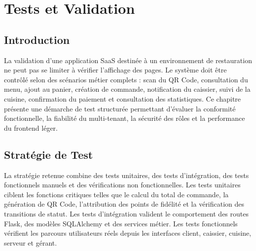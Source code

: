 \documentclass[12pt,a4paper]{report}
\begin{document}
\cleardoublepage
\chapter{Tests et Validation}

\section{Introduction}

La validation d'une application SaaS destinée à un environnement de restauration ne peut pas se limiter à vérifier l'affichage des pages. Le système doit être contrôlé selon des scénarios métier complets : scan du QR Code, consultation du menu, ajout au panier, création de commande, notification du caissier, suivi de la cuisine, confirmation du paiement et consultation des statistiques. Ce chapitre présente une démarche de test structurée permettant d'évaluer la conformité fonctionnelle, la fiabilité du multi-tenant, la sécurité des rôles et la performance du frontend léger.

\section{Stratégie de Test}

La stratégie retenue combine des tests unitaires, des tests d'intégration, des tests fonctionnels manuels et des vérifications non fonctionnelles. Les tests unitaires ciblent les fonctions critiques telles que le calcul du total de commande, la génération de QR Code, l'attribution des points de fidélité et la vérification des transitions de statut. Les tests d'intégration valident le comportement des routes Flask, des modèles SQLAlchemy et des services métier. Les tests fonctionnels vérifient les parcours utilisateurs réels depuis les interfaces client, caissier, cuisine, serveur et gérant.
\end{document}
